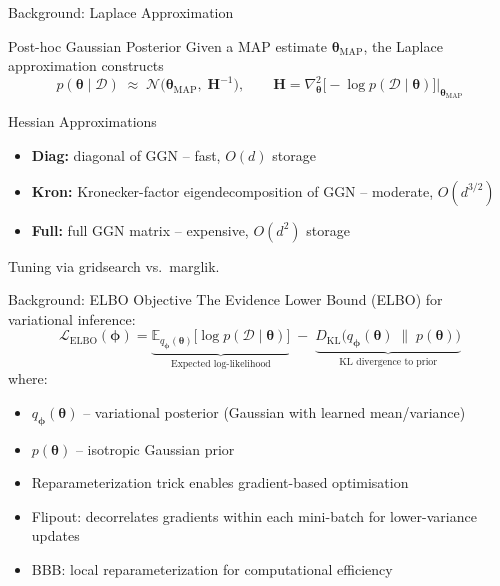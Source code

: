 \documentclass{beamer}
\begin{document}
\begin{frame}{Background: Laplace Approximation}
\begin{block}{Post-hoc Gaussian Posterior}
Given a MAP estimate $\bm{\theta}_{\text{MAP}}$, the Laplace approximation constructs
\[
p(\bm{\theta} \mid \mathcal{D}) \;\approx\; \mathcal{N}\!\bigl(\bm{\theta}_{\text{MAP}},\; \mathbf{H}^{-1}\bigr),
\qquad
\mathbf{H} = \nabla^2_{\bm{\theta}} \bigl[-\log p(\mathcal{D}\mid\bm{\theta})\bigr]\big|_{\bm{\theta}_{\text{MAP}}}
\]
\end{block}
\begin{block}{Hessian Approximations}
\begin{itemize}
    \item \textbf{Diag:} diagonal of GGN -- fast, $O(d)$ storage
    \item \textbf{Kron:} Kronecker-factor eigendecomposition of GGN -- moderate, $O(d^{3/2})$
    \item \textbf{Full:} full GGN matrix -- expensive, $O(d^2)$ storage
\end{itemize}
Tuning via gridsearch vs.\ marglik.
\end{block}
\end{frame}

\begin{frame}{Background: ELBO Objective}
The Evidence Lower Bound (ELBO) for variational inference:
\[
\mathcal{L}_{\text{ELBO}}(\bm{\phi}) = \underbrace{\mathbb{E}_{q_{\bm{\phi}}(\bm{\theta})}\bigl[\log p(\mathcal{D}\mid\bm{\theta})\bigr]}_{\text{Expected log-likelihood}} \;-\; \underbrace{D_{\text{KL}}\bigl(q_{\bm{\phi}}(\bm{\theta}) \;\|\; p(\bm{\theta})\bigr)}_{\text{KL divergence to prior}}
\]
where:
\begin{itemize}
    \item $q_{\bm{\phi}}(\bm{\theta})$ -- variational posterior (Gaussian with learned mean/variance)
    \item $p(\bm{\theta})$ -- isotropic Gaussian prior
    \item Reparameterization trick enables gradient-based optimisation
    \item Flipout: decorrelates gradients within each mini-batch for lower-variance updates
    \item BBB: local reparameterization for computational efficiency
\end{itemize}
\end{frame}
\end{document}
